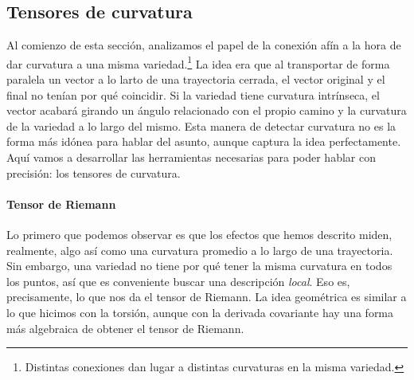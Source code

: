 \subsection{Tensores de curvatura}
\label{subsec.4tensorescurvatura}

Al comienzo de esta sección, analizamos el papel de la conexión afín a la hora de dar curvatura a una misma variedad.\footnote{Distintas conexiones dan lugar a distintas curvaturas en la misma variedad.} La idea era que al transportar de forma paralela un vector a lo larto de una trayectoria cerrada, el vector original y el final no tenían por qué coincidir. Si la variedad tiene curvatura intrínseca, el vector acabará girando un ángulo relacionado con el propio camino y la curvatura de la variedad a lo largo del mismo. Esta manera de detectar curvatura no es la forma más idónea para hablar del asunto, aunque captura la idea perfectamente. Aquí vamos a desarrollar las herramientas necesarias para poder hablar con precisión: los tensores de curvatura.

\paragraph{Tensor de Riemann} Lo primero que podemos observar es que los efectos que hemos descrito miden, realmente, algo así como una curvatura promedio a lo largo de una trayectoria. Sin embargo, una variedad no tiene por qué tener la misma curvatura en todos los puntos, así que es conveniente buscar una descripción \emph{local}. Eso es, precisamente, lo que nos da el tensor de Riemann. La idea geométrica es similar a lo que hicimos con la torsión, aunque con la derivada covariante hay una forma más algebraica de obtener el tensor de Riemann.

